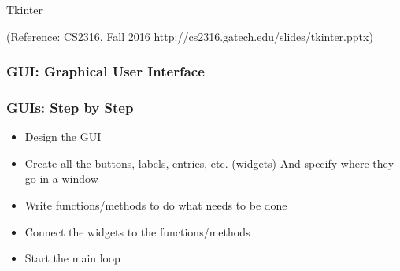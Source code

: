 \begin{frame}[fragile]\frametitle{}
\begin{center}
{\Large Tkinter}

\tiny{(Reference: CS2316, Fall 2016 http://cs2316.gatech.edu/slides/tkinter.pptx)}

\end{center}
\end{frame}



\begin{frame}[fragile] \frametitle{GUI: Graphical User Interface}

\hfill
{}

\end{frame}

\begin{frame}[fragile] \frametitle{GUIs: Step by Step}
\begin{itemize}
\item Design the GUI
\item Create all the buttons, labels, entries, etc. (widgets) And specify where they go in a window
\item Write functions/methods to do what needs to be done
\item Connect the widgets to the functions/methods
\item Start the main loop
\end{itemize}
\end{frame}

